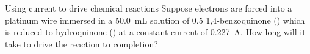 \documentclass[notes=show]{beamer}
\begin{document}

\begin{frame}[t]{Using current to drive chemical reactions}
	Suppose electrons are forced into a platinum wire immersed in a
	\SI{50.0}{\milli\liter} solution of \SI{0.5}{\Molar} 1,4-benzoquinone
	() which is reduced to hydroquinone () at a
	constant current of \SI{0.227}{\ampere}.  How long will it take
	to drive the reaction to completion?

\end{frame}

\clearpage
\end{document}
